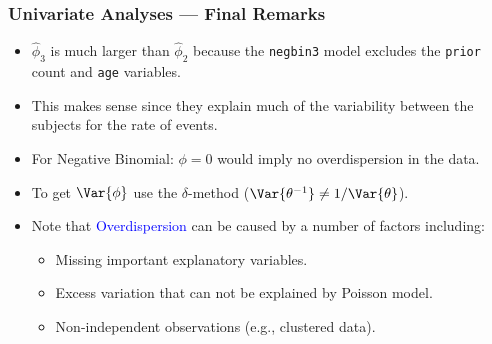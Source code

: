 \documentclass[oneside]{book}\usepackage[]{graphicx}\usepackage[svgnames]{xcolor}
\begin{document}
\subsubsection*{Univariate Analyses --- Final Remarks}
\begin{itemize}
      \item $ \hat{\phi}_3 $ is much larger than $ \hat{\phi}_2 $ because the \texttt{negbin3} model excludes the \texttt{prior} count
            and \texttt{age} variables.
      \item This makes sense since they explain much of the variability between the subjects
            for the rate of events.
      \item For Negative Binomial: $ \phi=0 $ would imply no overdispersion in the data.
      \item To get $ \Var{\phi} $ use the $ \delta $-method ($ \Var{\theta^{-1}}\ne 1/\Var{\theta} $).
      \item Note that \textcolor{Blue}{Overdispersion} can be caused by a number of factors including:
            \begin{itemize}
                  \item Missing important explanatory variables.
                  \item Excess variation that can not be explained by Poisson model.
                  \item Non-independent observations (e.g., clustered data).
            \end{itemize}
\end{itemize}
\end{document}
